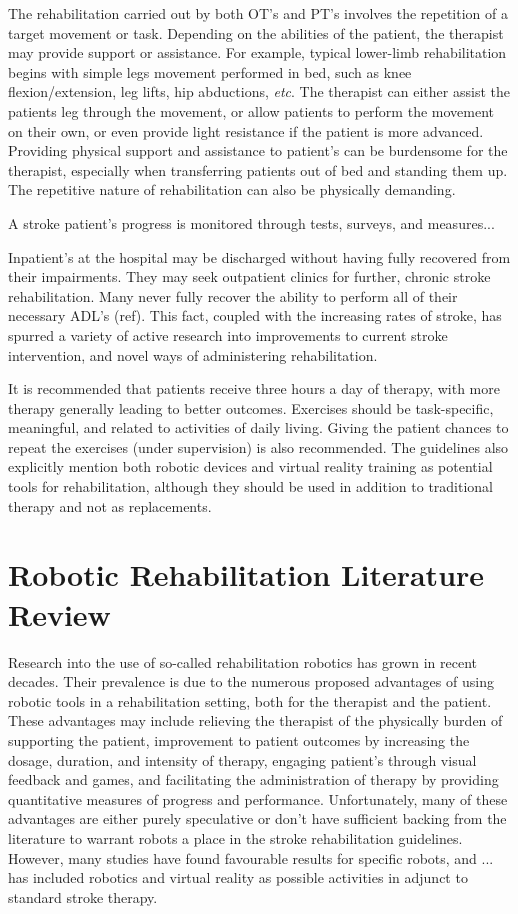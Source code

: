 \documentclass[12pt]{report}
\begin{document}
The rehabilitation carried out by both OT's and PT's involves the repetition of a target movement or task. Depending on the abilities of the patient, the therapist may provide support or assistance. For example, typical lower-limb rehabilitation begins with simple legs movement performed in bed, such as knee flexion/extension, leg lifts, hip abductions, \textit{etc}. The therapist can either assist the patients leg through the movement, or allow patients to perform the movement on their own, or even provide light resistance if the patient is more advanced. Providing physical support and assistance to patient's can be burdensome for the therapist, especially when transferring patients out of bed and standing them up. The repetitive nature of rehabilitation can also be physically demanding. 

A stroke patient's progress is monitored through tests, surveys, and measures...

Inpatient's at the hospital may be discharged without having fully recovered from their impairments. They may seek outpatient clinics for further, chronic stroke rehabilitation. Many never fully recover the ability to perform all of their necessary ADL's (ref). This fact, coupled with the increasing rates of stroke, has spurred a variety of active research into improvements to current stroke intervention, and novel ways of administering rehabilitation. 

It is recommended that patients receive three hours a day of therapy, with more therapy generally leading to better outcomes. Exercises should be task-specific, meaningful, and related to activities of daily living. Giving the patient chances to repeat the exercises (under supervision) is also recommended.  The guidelines also explicitly mention both robotic devices and virtual reality training as potential tools for rehabilitation, although they should be used in addition to traditional therapy and not as replacements.  


\section{Robotic Rehabilitation Literature Review}

	Research into the use of so-called rehabilitation robotics has grown in recent decades. Their prevalence is due to the numerous proposed advantages of using robotic tools in a rehabilitation setting, both for the therapist and the patient. These advantages may include relieving the therapist of the physically burden of supporting the patient, improvement to patient outcomes by increasing the dosage, duration, and intensity of therapy, engaging patient's through visual feedback and games, and facilitating the administration of therapy by providing quantitative measures of progress and performance. Unfortunately, many of these advantages are either purely speculative or don't have sufficient backing from the literature to warrant robots a place in the stroke rehabilitation guidelines. However, many studies have found favourable results for specific robots, and ... has included robotics and virtual reality as possible activities in adjunct to standard stroke therapy. 
	
\end{document}
